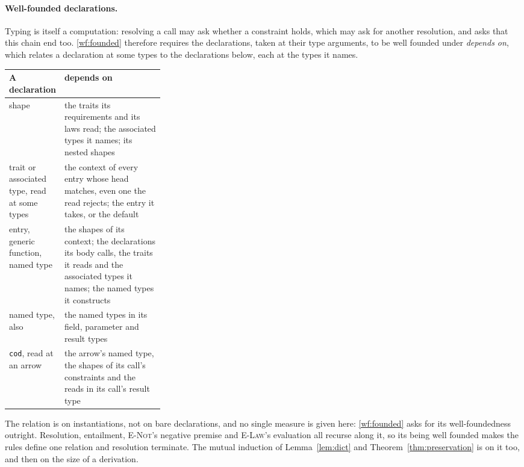 \paragraph{Well-founded declarations.}
Typing is itself a computation: resolving a call may ask whether a constraint holds, which may ask for another resolution, and \RuleThree{} asks that this chain end too.
\ref{wf:founded} therefore requires the declarations, taken at their type arguments, to be well founded under \emph{depends on}, which relates a declaration at some types to the declarations below, each at the types it names.
\begin{center}
\small
\begin{tabularx}{\linewidth}{@{}>{\raggedright\arraybackslash}p{0.3\linewidth}>{\raggedright\arraybackslash}X@{}}
\toprule
A declaration & depends on \\
\midrule
shape & the traits its requirements and its laws read; the associated types it names; its nested shapes \\
trait or associated type, read at some types & the context of every entry whose head matches, even one the read rejects; the entry it takes, or the default \\
entry, generic function, named type & the shapes of its context; the declarations its body calls, the traits it reads and the associated types it names; the named types it constructs \\
named type, also & the named types in its field, parameter and result types \\
\texttt{cod}, read at an arrow & the arrow's named type, the shapes of its call's constraints and the reads in its call's result type \\
\bottomrule
\end{tabularx}
\end{center}
The relation is on instantiations, not on bare declarations, and no single measure is given here: \ref{wf:founded} asks for its well-foundedness outright.
Resolution, entailment, \textsc{E-Not}'s negative premise and \textsc{E-Law}'s evaluation all recurse along it, so its being well founded makes the rules define one relation and resolution terminate.
The mutual induction of Lemma~\ref{lem:dict} and Theorem~\ref{thm:preservation} is on it too, and then on the size of a derivation.

